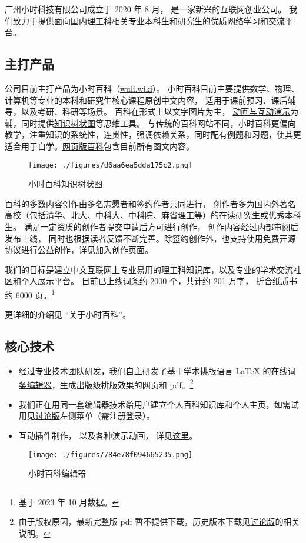
广州小时科技有限公司成立于 2020 年 8 月， 是一家新兴的互联网创业公司。 我们致力于提供面向国内理工科相关专业本科生和研究生的优质网络学习和交流平台。

\subsection{主打产品}
公司目前主打产品为小时百科（\href{https://wuli.wiki}{wuli.wiki}）。 小时百科目前主要提供数学、物理、计算机等专业的本科和研究生核心课程原创中文内容， 适用于课前预习、课后辅导，以及考研、科研等场景。 百科在形式上以文字图片为主， \href{https://wuli.wiki/apps/}{动画与互动演示}为辅，同时提供\href{https://wuli.wiki/tree/}{知识树状图}等思维工具。 与传统的百科网站不同，小时百科更偏向教学，注重知识的系统性，连贯性，强调依赖关系，同时配有例题和习题，使其更适合用于自学。\href{https://wuli.wiki/online/}{网页版百科}包含目前所有图文内容。

\begin{figure}[ht]
\centering
\texttt{[image: ./figures/d6aa6ea5dda175c2.png]}
\caption{小时百科\href{https://wuli.wiki/tree/}{知识树状图}} \label{fig_Compny_2}
\end{figure}

百科的多数内容创作由多名志愿者和签约作者共同进行， 创作者多为国内外著名高校（包括清华、北大、中科大、中科院、麻省理工等）的在读研究生或优秀本科生。 满足一定资质的创作者提交申请后方可进行创作， 创作内容经过内部审阅后发布上线， 同时也根据读者反馈不断完善。除签约创作外，也支持使用免费开源协议进行公益创作，详见\href{https://wuli.wiki/forum/f9ec7f8e-ca37-4278-a77e-ba5c0e40e115}{加入创作页面}。

我们的目标是建立中文互联网上专业易用的理工科知识库，以及专业的学术交流社区和个人展示平台。 目前已上线词条约 2000 个，共计约 201 万字， 折合纸质书约 6000 页。\footnote{基于 2023 年 10 月数据。}

更详细的介绍见 “关于小时百科”。

\subsection{核心技术}
\begin{itemize}
\item 经过专业技术团队研发，我们自主研发了基于学术排版语言 LaTeX 的\href{https://wuli.wiki/editor/}{在线词条编辑器}，生成出版级排版效果的网页和 pdf。\footnote{由于版权原因，最新完整版 pdf 暂不提供下载，历史版本下载见\href{https://wuli.wiki/forum/}{讨论版}的相关说明。} 
\item 我们正在用同一套编辑器技术给用户建立个人百科知识库和个人主页，如需试用见\href{https://wuli.wiki/forum/}{讨论版}左侧菜单（需注册登录）。
\item 互动插件制作， 以及各种演示动画， 详见\href{http://wuli.wiki/apps}{这里}。
\end{itemize}

\begin{figure}[ht]
\centering
\texttt{[image: ./figures/784e78f094665235.png]}
\caption{小时百科编辑器} \label{fig_Compny_1}
\end{figure}
